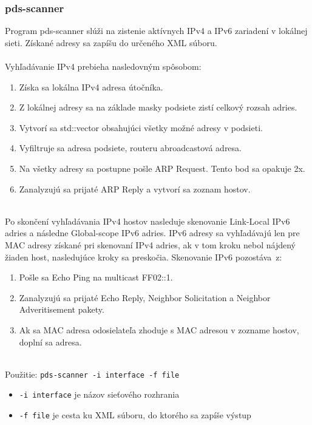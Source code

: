 \documentclass[a4paper,11pt]{article}
\begin{document}
\subsubsection{pds-scanner}
Program pds-scanner slúži na zistenie aktívnych IPv4 a IPv6 zariadení v lokálnej sieti. Získané adresy sa zapíšu do určeného XML súboru.
\\ \\
Vyhľadávanie IPv4 prebieha nasledovným spôsobom:
\begin{enumerate}
\item Získa sa lokálna IPv4 adresa útočníka.
\item Z lokálnej adresy sa na základe masky podsiete zistí celkový rozsah adries.
\item Vytvorí sa std::vector obsahujúci všetky možné adresy v podsieti.
\item Vyfiltruje sa adresa podsiete, routeru abroadcastová adresa.
\item Na všetky adresy sa postupne pošle ARP Request. Tento bod sa opakuje 2x.
\item Zanalyzujú sa prijaté ARP Reply a vytvorí sa zoznam hostov.
\end{enumerate}
\ \\
Po skončení vyhľadávania IPv4 hostov nasleduje skenovanie Link-Local IPv6 adries a následne Global-scope IPv6 adries. IPv6 adresy sa vyhľadávajú len pre MAC adresy získané pri skenovaní IPv4 adries, ak v tom kroku nebol nájdený žiaden host, nasledujúce kroky sa preskočia. Skenovanie IPv6 pozostáva~z:
\begin{enumerate}
\item Pošle sa Echo Ping na multicast FF02::1.
\item Zanalyzujú sa prijaté Echo Reply, Neighbor Solicitation a Neighbor Adveritisement pakety.
\item Ak sa MAC adresa odosielateľa zhoduje s MAC adresou v zozname hostov, doplní sa adresa.
\end{enumerate}

\ \\
Použitie: \texttt{pds-scanner -i interface -f file}
\begin{itemize}
\item \texttt{-i interface} je názov sieťového rozhrania
\item \texttt{-f file} je cesta ku XML súboru, do ktorého sa zapíše výstup
\end{itemize}
\end{document}
